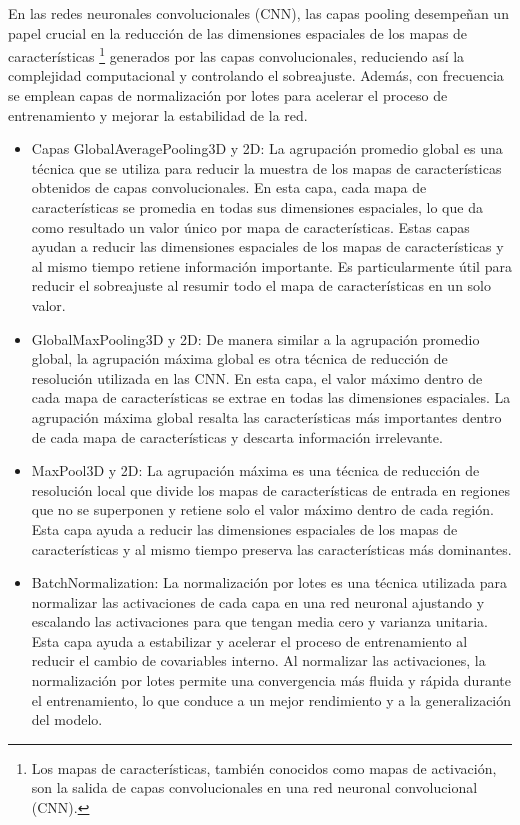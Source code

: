 \documentclass[10pt, oneside, a4paper]{article}
\begin{document}
	En las redes neuronales convolucionales (CNN), las capas pooling desempeñan un papel crucial en la reducción de las dimensiones espaciales de los mapas de características \footnote{Los mapas de características, también conocidos como mapas de activación, son la salida de capas convolucionales en una red neuronal convolucional (CNN).} generados por las capas convolucionales, reduciendo así la complejidad computacional y controlando el sobreajuste. Además, con frecuencia se emplean capas de normalización por lotes para acelerar el proceso de entrenamiento y mejorar la estabilidad de la red.
	
	\begin{itemize}
		\item Capas GlobalAveragePooling3D y 2D: La agrupación promedio global es una técnica que se utiliza para reducir la muestra de los mapas de características obtenidos de capas convolucionales. En esta capa, cada mapa de características se promedia en todas sus dimensiones espaciales, lo que da como resultado un valor único por mapa de características. Estas capas ayudan a reducir las dimensiones espaciales de los mapas de características y al mismo tiempo retiene información importante. Es particularmente útil para reducir el sobreajuste al resumir todo el mapa de características en un solo valor.
		\item GlobalMaxPooling3D y 2D: De manera similar a la agrupación promedio global, la agrupación máxima global es otra técnica de reducción de resolución utilizada en las CNN. En esta capa, el valor máximo dentro de cada mapa de características se extrae en todas las dimensiones espaciales. La agrupación máxima global resalta las características más importantes dentro de cada mapa de características y descarta información irrelevante.
		\item MaxPool3D y 2D: La agrupación máxima es una técnica de reducción de resolución local que divide los mapas de características de entrada en regiones que no se superponen y retiene solo el valor máximo dentro de cada región. Esta capa ayuda a reducir las dimensiones espaciales de los mapas de características y al mismo tiempo preserva las características más dominantes. 
		\item BatchNormalization: La normalización por lotes es una técnica utilizada para normalizar las activaciones de cada capa en una red neuronal ajustando y escalando las activaciones para que tengan media cero y varianza unitaria. Esta capa ayuda a estabilizar y acelerar el proceso de entrenamiento al reducir el cambio de covariables interno. Al normalizar las activaciones, la normalización por lotes permite una convergencia más fluida y rápida durante el entrenamiento, lo que conduce a un mejor rendimiento y a la generalización del modelo.
	\end{itemize}
	
\end{document}
